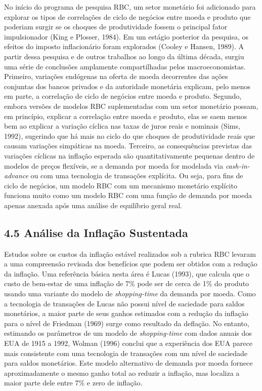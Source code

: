 \documentclass[12pt]{article}
\begin{document}
No início do programa de pesquisa RBC, um setor monetário foi adicionado para explorar os tipos de correlações de ciclo de negócios entre moeda e produto que poderiam surgir se os choques de produtividade fossem o principal fator impulsionador (King e Plosser, 1984). Em um estágio posterior da pesquisa, os efeitos do imposto inflacionário foram explorados (Cooley e Hansen, 1989). A partir dessa pesquisa e de outros trabalhos ao longo da última década, surgiu uma série de conclusões amplamente compartilhadas pelos macroeconomistas. Primeiro, variações endógenas na oferta de moeda decorrentes das ações conjuntas dos bancos privados e da autoridade monetária explicam, pelo menos em parte, a correlação de ciclo de negócios entre moeda e produto. Segundo, embora versões de modelos RBC suplementadas com um setor monetário possam, em princípio, explicar a correlação entre moeda e produto, elas se saem menos bem ao explicar a variação cíclica nas taxas de juros reais e nominais (Sims, 1992), sugerindo que há mais no ciclo do que choques de produtividade reais que causam variações simpáticas na moeda. Terceiro, as consequências previstas das variações cíclicas na inflação esperada são quantitativamente pequenas dentro de modelos de preços flexíveis, se a demanda por moeda for modelada via \textit{cash-in-advance} ou com uma tecnologia de transações explícita. Ou seja, para fins de ciclo de negócios, um modelo RBC com um mecanismo monetário explícito funciona muito como um modelo RBC com uma função de demanda por moeda apenas anexada após uma análise de equilíbrio geral real.

\subsection{4.5 Análise da Inflação Sustentada}

Estudos sobre os custos da inflação estável realizados sob a rubrica RBC levaram a uma compreensão revisada dos benefícios que podem ser obtidos com a redução da inflação. Uma referência básica nesta área é Lucas (1993), que calcula que o custo de bem-estar de uma inflação de 7\% pode ser de cerca de 1\% do produto usando uma variante do modelo de \textit{shopping-time} da demanda por moeda. Como a tecnologia de transações de Lucas não possui nível de saciedade para saldos monetários, a maior parte de seus ganhos estimados com a redução da inflação para o nível de Friedman (1969) surge como resultado da deflação. No entanto, estimando os parâmetros de um modelo de \textit{shopping-time} com dados anuais dos EUA de 1915 a 1992, Wolman (1996) conclui que a experiência dos EUA parece mais consistente com uma tecnologia de transações com um nível de saciedade para saldos monetários. Este modelo alternativo de demanda por moeda fornece aproximadamente o mesmo ganho total ao reduzir a inflação, mas localiza a maior parte dele entre 7\% e zero de inflação.
\end{document}
